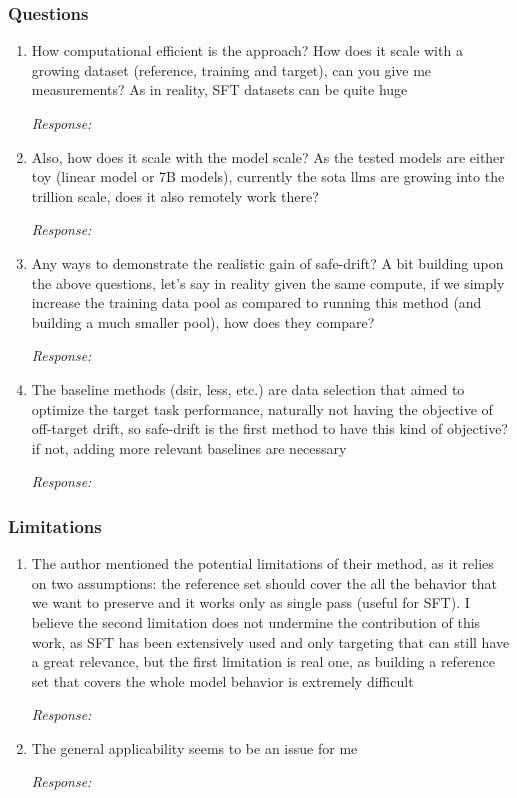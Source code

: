 \documentclass{article}
\newcommand{\response}[1][Response]{%
  \begin{answerbox}\textit{\small #1:}\end{answerbox}
}
\begin{document}
\subsubsection*{Questions}
\begin{enumerate}
    \item How computational efficient is the approach? How does it scale with a growing dataset (reference, training and target), can you give me measurements? As in reality, SFT datasets can be quite huge
    \response
    \item Also, how does it scale with the model scale? As the tested models are either toy (linear model or 7B models), currently the sota llms are growing into the trillion scale, does it also remotely work there?
    \response
    \item Any ways to demonstrate the realistic gain of safe-drift? A bit building upon the above questions, let's say in reality given the same compute, if we simply increase the training data pool as compared to running this method (and building a much smaller pool), how does they compare?
    \response
    \item The baseline methods (dsir, less, etc.) are data selection that aimed to optimize the target task performance, naturally not having the objective of off-target drift, so safe-drift is the first method to have this kind of objective? if not, adding more relevant baselines are necessary
    \response
\end{enumerate}

\subsubsection*{Limitations}
\begin{enumerate}
    \item The author mentioned the potential limitations of their method, as it relies on two assumptions: the reference set should cover the all the behavior that we want to preserve and it works only as single pass (useful for SFT). I believe the second limitation does not undermine the contribution of this work, as SFT has been extensively used and only targeting that can still have a great relevance, but the first limitation is real one, as building a reference set that covers the whole model behavior is extremely difficult
    \response
    \item The general applicability seems to be an issue for me
    \response
\end{enumerate}
\end{document}
